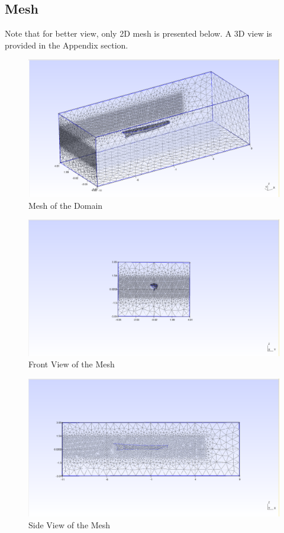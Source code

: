 \documentclass[12pt]{article} %
\begin{document}
\subsection{Mesh}
Note that for better view, only 2D mesh is presented below. A 3D view is provided in the Appendix section.
\begin{figure}[ht]
    \centering
    \includegraphics[width=1\textwidth]{Mesh_1.png}
    \caption{Mesh of the Domain}
    
\end{figure}
\begin{figure}[ht]
    \centering
    \includegraphics[width=1\textwidth]{Mesh_2.png}
    \caption{Front View of the Mesh}
\end{figure}

\begin{figure}[ht]
    \centering
    \includegraphics[width=1\textwidth]{Mesh_3.png}
    \caption{Side View of the Mesh}
\end{figure}
\end{document}
